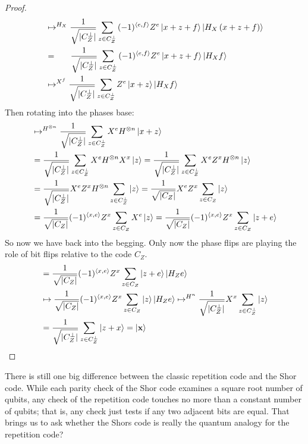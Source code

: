 \begin{proof}
\begin{equation*}
\begin{split}
        & \mapsto^{H_{X}} \GZZZ{ (-1)^{\braket{e,f} }Z^{e}\ket{ x + z + f} \ket{ H_{X} \left(x + z + f\right) }  } \\ 
        & = \ \ \ \ \ \GZZZ{ (-1)^{\braket{e,f} }Z^{e}\ket{ x + z + f} \ket{ H_{X}f }  }\\
        & \mapsto^{X^{f}} \GZZZ{ Z^{e}\ket{ x + z} \ket{ H_{X}f }  }  
      \end{split}
\end{equation*}
Then rotating into the phases base: 
\begin{equation*}
  \begin{split}
   & \mapsto^{H^{\otimes n}} \GZZZ{  X^{e}H^{\otimes n}\ket{ x + z} }  \\ 
        & = \GZZZ{  X^{e}H^{\otimes n} X^{x} \ket{ z} }  = \GZZZ{  X^{e} Z^{x} H^{\otimes n} \ket{ z} } \\
        & = \GZZZW{ \ket{ z} }{X^{e} Z^{x} H^{\otimes n} }  =  \GXXXW{  \ket{ z} }{ X^{e} Z^{x} } \\
        & =  \GXXXW{   X^{e}\ket{ z} }{ (-1)^{\braket{x,e}} Z^{x}}  =  \GXXXW{   \ket{ z + e} }{ (-1)^{\braket{x,e}} Z^{x}} 
      \end{split}
\end{equation*}
So now we have back into the begging. Only now the phase flips are playing the role of bit flips relative to the code $C_{Z}$.    
\begin{equation*}
  \begin{split}
        & =  \GXXXW{   \ket{ z + e} \ket{ H_{Z}e }}{ (-1)^{\braket{x,e}} Z^{x}} \\
        & \mapsto  \GXXXW{   \ket{ z } \ket{ H_{Z}e }}{ (-1)^{\braket{x,e}} Z^{x}} \mapsto^{H^{n}}  \GZZZW{   \ket{ z }}{ X^{x}}\\ 
        & = \GZZZ{ \ket{z + x}} = \ket{\mathbf{x}}
      \end{split}
    \end{equation*}
  \end{proof}
  
  There is still one big difference between the classic repetition code and the Shor code. While each parity check of the Shor code examines a square root number of qubits, any check of the repetition code touches no more than a constant number of qubits; that is, any check just tests if any two adjacent bits are equal.  That brings us to ask whether the Shors code is really the quantum analogy for the repetition code? 

